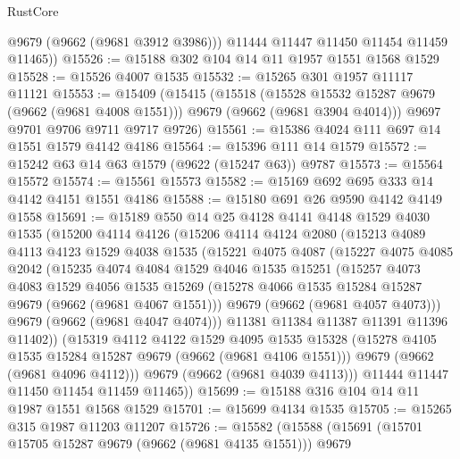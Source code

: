 \begin{lexlean}{RustCore}
\begin{coremodule}
          @9679
          (@9662 (@9681 @3912 @3986)))
        @11444
        @11447
        @11450
        @11454
        @11459
        @11465))
@15526 := @15188 @302 @104 @14 @11 @1957 @1551 @1568 @1529
@15528 := @15526 @4007 @1535
@15532 := @15265 @301 @1957 @11117 @11121
@15553 := @15409
    (@15415
      (@15518
        (@15528 @15532 @15287 @9679 (@9662 (@9681 @4008 @1551)))
        @9679
        (@9662 (@9681 @3904 @4014)))
      @9697
      @9701
      @9706
      @9711
      @9717
      @9726)
@15561 := @15386 @4024 @111 @697 @14 @1551 @1579 @4142 @4186
@15564 := @15396 @111 @14 @1579
@15572 := @15242 @63 @14 @63 @1579 (@9622 (@15247 @63)) @9787
@15573 := @15564 @15572
@15574 := @15561 @15573
@15582 := @15169 @692 @695 @333 @14 @4142 @4151 @1551 @4186
@15588 := @15180 @691 @26 @9590 @4142 @4149 @1558
@15691 := @15189
    @550
    @14
    @25
    @4128
    @4141
    @4148
    @1529
    @4030
    @1535
    (@15200
      @4114
      @4126
      (@15206
        @4114
        @4124
        @2080
        (@15213
          @4089
          @4113
          @4123
          @1529
          @4038
          @1535
          (@15221
            @4075
            @4087
            (@15227
              @4075
              @4085
              @2042
              (@15235
                @4074
                @4084
                @1529
                @4046
                @1535
                @15251
                (@15257
                  @4073
                  @4083
                  @1529
                  @4056
                  @1535
                  @15269
                  (@15278 @4066 @1535 @15284 @15287 @9679 (@9662 (@9681 @4067 @1551)))
                  @9679
                  (@9662 (@9681 @4057 @4073)))
                @9679
                (@9662 (@9681 @4047 @4074)))
              @11381
              @11384
              @11387
              @11391
              @11396
              @11402))
          (@15319
            @4112
            @4122
            @1529
            @4095
            @1535
            @15328
            (@15278 @4105 @1535 @15284 @15287 @9679 (@9662 (@9681 @4106 @1551)))
            @9679
            (@9662 (@9681 @4096 @4112)))
          @9679
          (@9662 (@9681 @4039 @4113)))
        @11444
        @11447
        @11450
        @11454
        @11459
        @11465))
@15699 := @15188 @316 @104 @14 @11 @1987 @1551 @1568 @1529
@15701 := @15699 @4134 @1535
@15705 := @15265 @315 @1987 @11203 @11207
@15726 := @15582
    (@15588
      (@15691
        (@15701 @15705 @15287 @9679 (@9662 (@9681 @4135 @1551)))
        @9679

\end{coremodule}
\end{lexlean}
